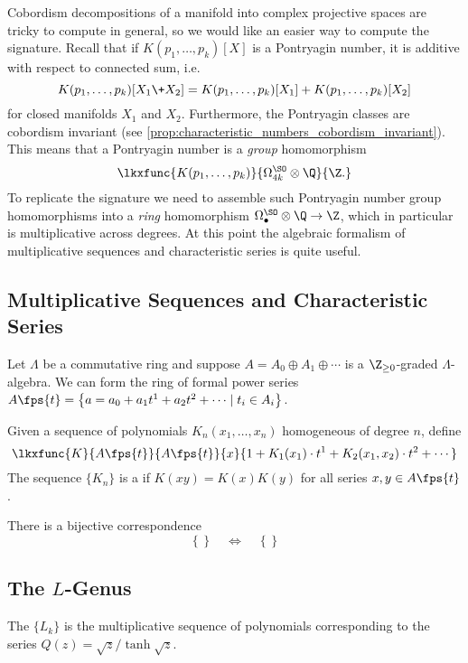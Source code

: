 Cobordism decompositions of a manifold into complex projective spaces are tricky to compute in general, so we would like an easier way to compute the signature.
Recall that if $K(p_1,\ldots, p_k)[X]$ is a Pontryagin number, it is additive with respect to connected sum, i.e.
\[
	K(p_1,\ldots,p_k)[X_1\+ X_2] = K(p_1,\ldots,p_k)[X_1]+K(p_1,\ldots,p_k)[X_2]
\]
for closed manifolds $X_1$ and $X_2$. Furthermore, the Pontryagin classes are cobordism invariant (see \cref{prop:characteristic_numbers_cobordism_invariant}). This means that a Pontryagin number is a \emph{group} homomorphism
\[
	\lkxfunc{K(p_1,\ldots,p_k)}{\Omega^\SO_{4k}\otimes \Q}{\Z.}
\]
To replicate the signature we need to assemble such Pontryagin number group homomorphisms into a \emph{ring} homomorphism $\Omega^\SO_\bullet\otimes \Q\to \Z$, which in particular is multiplicative across degrees. At this point the algebraic formalism of multiplicative sequences and characteristic series is quite useful.

\subsection*{Multiplicative Sequences and Characteristic Series}

Let $\Lambda$ be a commutative ring and suppose $A=A_0\oplus A_1\oplus\cdots$ is a $\Z_{\geq 0}$-graded $\Lambda$-algebra. We can form the ring of formal power series $A\fps{t} = \left\{ a =a_0+ a_1 t^1+ a_2 t^2+\cdots \mid t_i\in A_i\right\}$.

\begin{definition}
	Given a sequence of polynomials $K_n(x_1, \ldots, x_n)$ homogeneous of degree $n$, define
	\[
		\lkxfunc{K}{A\fps{t}}{A\fps{t}}{x}{1+K_1(x_1)\cdot t^1+K_2(x_1,x_2)\cdot t^2+\cdots}
	\]
	The sequence $\{K_n\}$ is a  if $K(xy)=K(x)K(y)$ for all series $x,y\in A\fps{t}$.
\end{definition}

\begin{proposition}
	There is a bijective correspondence
	\[
		\left\{\right\}
		\quad\iff\quad
		\left\{\right\}
	\]
\end{proposition}

\subsection*{The $L$-Genus}

\begin{definition}
	The  $\{L_k\}$ is the multiplicative sequence of polynomials corresponding to the series $Q(z) = \sqrt{z}/\tanh\sqrt{z}$.
\end{definition}

